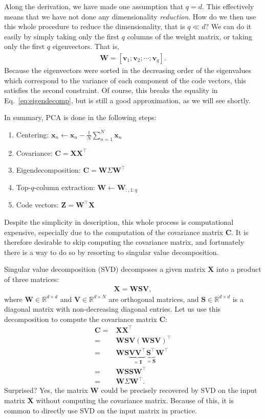 \documentclass{report}
\newcommand{\vect}[1]{\mathbf{#1}}
\newcommand{\matr}[1]{\mathbf{#1}}
\newcommand{\vv}[0]{\vect{v}}
\newcommand{\vx}[0]{\vect{x}}
\newcommand{\mW}[0]{\matr{W}}
\newcommand{\mZ}[0]{\matr{Z}}
\newcommand{\mX}[0]{\matr{X}}
\newcommand{\mV}[0]{\matr{V}}
\newcommand{\mC}{\matr{C}}
\newcommand{\mS}{\matr{S}}
\newcommand{\mI}{\matr{I}}
\newcommand{\RR}[0]{\mathbb{R}}
\begin{document}
Along the derivation, we have made one assumption that $q=d$. This effectively
means that we have not done any dimensionality {\it reduction}. How do we then
use this whole procedure to reduce the dimensionality, that is $q \ll d$? We can
do it easily by simply taking only the first $q$ columns of the weight matrix, or
taking only the first $q$ eigenvectors. That is,
\begin{align*}
    \mW = \left[
        \vv_1; \vv_2; \cdots; \vv_q
    \right].
\end{align*}
Because the eigenvectors were sorted in the decreasing order of the
eigenvalues which correspond to the variance of each component of the code
vectors, this satisfies the second constraint. Of course, this breaks the
equality in Eq.~\eqref{eq:eigendecomp}, but is still a good approximation, as we
will see shortly.

In summary, PCA is done in the following steps:
\begin{enumerate}
    \item Centering: $\vx_n \leftarrow \vx_n - \frac{1}{N}\sum_{n=1}^N \vx_n$
    \item Covariance: $\mC = \mX \mX^\top$
    \item Eigendecomposition: $\mC = \mW \Sigma \mW^\top$
    \item Top-$q$-column extraction: $\mW \leftarrow \mW_{:,1:q}$
    \item Code vectors: $\mZ = \mW^\top \mX$
\end{enumerate}
Despite the simplicity in description, this whole process is computational
expensive, especially due to the computation of the covariance matrix $\mC$.  It
is therefore desirable to skip computing the covariance matrix, and fortunately
there is a way to do so by resorting to singular value decomposition.

Singular value decomposition (SVD) decomposes a given matrix $\mX$ into a
product of three matrices:
\begin{align}
    \label{eq:svd}
    \mX = \mW \mS \mV,
\end{align}
where $\mW \in \RR^{d \times d}$ and $\mV \in \RR^{d \times N}$ are orthogonal
matrices, and $\mS \in \RR^{d \times d}$ is a diagonal matrix with
non-decreasing diagonal entries. Let us use this decomposition to compute the
covariance matrix $\mC$:
\begin{align*}
    \mC =& \mX \mX^\top \\
    =& \mW \mS \mV (\mW \mS \mV)^\top \\
    =& \mW \mS \underbrace{\mV \mV^\top}_{=\mI} \underbrace{\mS^\top}_{=\mS} \mW^\top \\
    =& \mW \mS \mS \mW^\top \\
    =& \mW \Sigma \mW^\top.
\end{align*}
Surprised? Yes, the matrix $\mW$ could be precisely recovered by SVD on the
input matrix $\mX$ without computing the covariance matrix. Because of this, it
is common to directly use SVD on the input matrix in practice.
\end{document}
